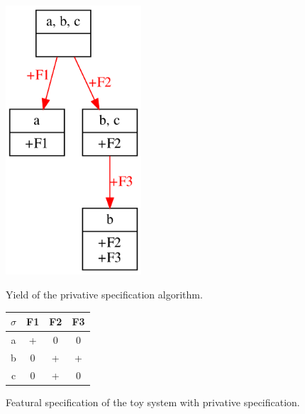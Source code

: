 \documentclass[12pt, oneside]{article}   	%
\begin{document}
\begin{figure}
	\centering
	\begin{minipage}{0.45\textwidth}
		\centering
		\includegraphics[width=0.45\textwidth]{toy_system_privative.png}
		\caption{Yield of the privative specification algorithm.}\label{fig:toy_system_privative}
	\end{minipage}
	\begin{minipage}{0.45\textwidth}
		\centering
		\captionsetup{type=table} %
		\begin{tabular} {|c||c|c|c|}
			\hline
			$\sigma$ & F1 & F2 & F3 \\ \hline
			a & + & 0 & 0 \\
			b & 0 & + & + \\
			c & 0 & + & 0  \\
			\hline
		\end{tabular}
		\caption{Featural specification of the toy system with privative specification.}\label{table:toy_system_privative}
	\end{minipage}
\end{figure}

\end{document}
